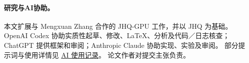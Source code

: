 \paragraph*{研究与AI协助。}
\label{front:provenance}
本文扩展与 Mengxuan Zhang 合作的 JHQ-GPU 工作\cite{adc_artifact}，并以 JHQ 为基础\cite{jhq}。
OpenAI Codex 协助实质性起草、修改、LaTeX、分析及代码／日志核查\cite{ai_codex_record}；
ChatGPT 提供框架和审阅\cite{ai_chatgpt_record}；Anthropic Claude 协助实现、实验及审阅\cite{ai_claude_record}。
部分提示词与使用详情见
\href{https://github.com/lrlorry/8800_report/blob/main/docs/ai-use-record.md}{AI 使用记录}。
论文作者对提交主张负责。
